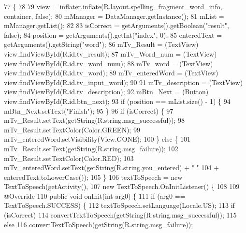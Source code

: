 \begin{DoxyCode}
77                                                                                                       \{
78 
79         view = inflater.inflate(R.layout.spelling\_fragment\_word\_info, container, \textcolor{keyword}{false});
80         mManager = DataManager.getInstance();
81         mList = mManager.getList();
82 
83         isCorrect = getArguments().getBoolean(\textcolor{stringliteral}{"result"}, \textcolor{keyword}{false});
84         position = getArguments().getInt(\textcolor{stringliteral}{"index"}, 0);
85         enteredText = getArguments().getString(\textcolor{stringliteral}{"word"});
86         mTv\_Result = (TextView) view.findViewById(R.id.tv\_result);
87         mTv\_Word\_num = (TextView) view.findViewById(R.id.tv\_word\_num);
88         mTv\_word = (TextView) view.findViewById(R.id.tv\_word);
89         mTv\_enteredWord = (TextView) view.findViewById(R.id.tv\_input\_word);
90 
91         mTv\_description = (TextView) view.findViewById(R.id.tv\_description);
92         mBtn\_Next = (Button) view.findViewById(R.id.btn\_next);
93         \textcolor{keywordflow}{if} (position == mList.size() - 1) \{
94             mBtn\_Next.setText(\textcolor{stringliteral}{"Finish"});
95         \}
96         \textcolor{keywordflow}{if} (isCorrect) \{
97             mTv\_Result.setText(getString(R.string.msg\_successful));
98             mTv\_Result.setTextColor(Color.GREEN);
99             mTv\_enteredWord.setVisibility(View.GONE);
100         \} \textcolor{keywordflow}{else} \{
101             mTv\_Result.setText(getString(R.string.msg\_failure));
102             mTv\_Result.setTextColor(Color.RED);
103             mTv\_enteredWord.setText(getString(R.string.you\_entered) + \textcolor{stringliteral}{" "}
104                     + enteredText.toLowerCase());
105         \}
106         textToSpeech = \textcolor{keyword}{new} TextToSpeech(getActivity(),
107                 \textcolor{keyword}{new} TextToSpeech.OnInitListener() \{
108 
109                     @Override
110                     \textcolor{keyword}{public} \textcolor{keywordtype}{void} onInit(\textcolor{keywordtype}{int} arg0) \{
111                         \textcolor{keywordflow}{if} (arg0 == TextToSpeech.SUCCESS) \{
112                             textToSpeech.setLanguage(Locale.US);
113                             \textcolor{keywordflow}{if} (isCorrect)
114                                 convertTextToSpeech(getString(R.string.msg\_successful));
115                             \textcolor{keywordflow}{else}
116                                 convertTextToSpeech(getString(R.string.msg\_failure));

\end{DoxyCode}
